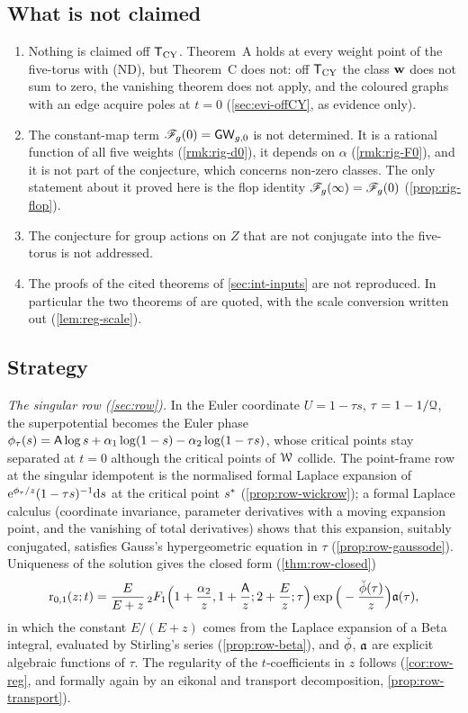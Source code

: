 \subsection{What is not claimed}
\label{sec:int-notclaimed}

\begin{enumerate}
\item Nothing is claimed off $\mathsf{T}_{\mathrm{CY}}$. Theorem~A holds at every weight point of the five-torus with (ND), but Theorem~C does not: off $\mathsf{T}_{\mathrm{CY}}$ the class $\mathbf{w}$ does not sum to zero, the vanishing theorem does not apply, and the coloured graphs with an edge acquire poles at $t=0$ (\cref{sec:evi-offCY}, as evidence only).
\item The constant-map term $\mathscr{F}_g(0)=\mathsf{GW}_{g,0}$ is not determined. It is a rational function of all five weights (\cref{rmk:rig-d0}), it depends on $\alpha$ (\cref{rmk:rig-F0}), and it is not part of the conjecture, which concerns non-zero classes. The only statement about it proved here is the flop identity $\mathscr{F}_g(\infty)=\mathscr{F}_g(0)$ (\cref{prop:rig-flop}).
\item The conjecture for group actions on $Z$ that are not conjugate into the five-torus is not addressed.
\item The proofs of the cited theorems of \cref{sec:int-inputs} are not reproduced. In particular the two theorems of \cite{LP2} are quoted, with the scale conversion written out (\cref{lem:reg-scale}).
\end{enumerate}

\subsection{Strategy}
\label{sec:int-strategy}

\emph{The singular row (\cref{sec:row}).} In the Euler coordinate $U=1-\tau s$, $\tau=1-1/\mathcal{Q}$, the superpotential becomes the Euler phase $\phi_\tau(s)=\mathsf{A}\log s+\alpha_1\log(1-s)-\alpha_2\log(1-\tau s)$, whose critical points stay separated at $t=0$ although the critical points of $\mathcal{W}$ collide. The point-frame row at the singular idempotent is the normalised formal Laplace expansion of $\mathrm{e}^{\phi_\tau/z}(1-\tau s)^{-1}\mathrm{d} s$ at the critical point $s^{\ast}$ (\cref{prop:row-wickrow}); a formal Laplace calculus (coordinate invariance, parameter derivatives with a moving expansion point, and the vanishing of total derivatives) shows that this expansion, suitably conjugated, satisfies Gauss's hypergeometric equation in $\tau$ (\cref{prop:row-gaussode}). Uniqueness of the solution gives the closed form (\cref{thm:row-closed})
\[
\mathrm{r}_{0,1}(z;t)=\frac{E}{E+z}\,{}_2F_1\Big(1+\frac{\alpha_2}z,1+\frac{\mathsf{A}}z;2+\frac Ez;\tau\Big)\exp\Big(-\frac{\breve{\phi}(\tau)}z\Big)\mathfrak{a}(\tau),
\]
in which the constant $E/(E+z)$ comes from the Laplace expansion of a Beta integral, evaluated by Stirling's series (\cref{prop:row-beta}), and $\breve{\phi}$, $\mathfrak{a}$ are explicit algebraic functions of $\tau$. The regularity of the $t$-coefficients in $z$ follows (\cref{cor:row-reg}, and formally again by an eikonal and transport decomposition, \cref{prop:row-transport}).

